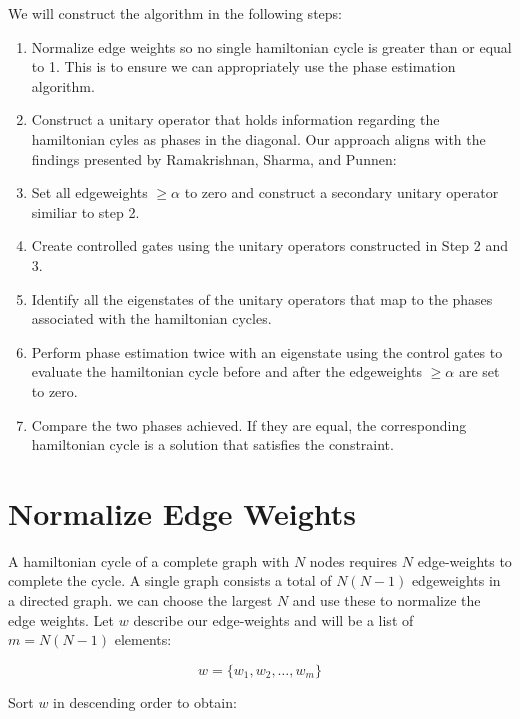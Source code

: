 \documentclass[msc,oneside]{ubcthesis}
\begin{document}
	We will construct the algorithm in the following steps:
	\begin{enumerate}
		\item Normalize edge weights so no single hamiltonian cycle is greater than or equal to 1. This is to ensure we can appropriately use the phase estimation algorithm.\\
		\item Construct a unitary operator that holds information regarding the hamiltonian cyles as phases in the diagonal. Our approach aligns with the findings presented by Ramakrishnan, Sharma, and Punnen: \cite{srinivasan2018efficient}\\
		\item Set all edgeweights $\geq \alpha$ to zero and construct a secondary unitary operator similiar to step 2.\\
		\item Create controlled gates using the unitary operators constructed in Step 2 and 3.\\
		\item Identify all the eigenstates of the unitary operators that map to the phases associated with the hamiltonian cycles.\\
		\item Perform phase estimation twice with an eigenstate using the control gates to evaluate the hamiltonian cycle before and after the edgeweights $\geq \alpha$ are set to zero.\\
		\item Compare the two phases achieved. If they are equal, the corresponding hamiltonian cycle is a solution that satisfies the constraint.\\
		
	\end{enumerate}
		
	\section{Normalize Edge Weights}
	
	A hamiltonian cycle of a complete graph with $N$ nodes requires $N$ edge-weights to complete the cycle. A single graph consists a total of $N(N-1)$ edgeweights in a directed graph. we can choose the largest $N$ and use these to normalize the edge weights. Let $w$ describe our edge-weights and will be a list of $m = N(N-1)$ elements:
	
	$$w = \{w_1, w_2, \ldots, w_m\}$$ 
	
	Sort $w$ in descending order to obtain:
	
\end{document}
